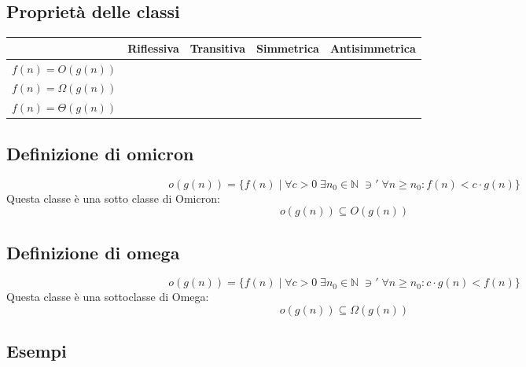 \documentclass[italian]{article}
\newcommand{\crossmark}{\textcolor{red}{\text{\ding{56}}}}
\renewcommand{\checkmark}{\textcolor{ForestGreen}{\text{\ding{52}}}}
\newcommand{\ins}[1]{\text{$\mathbb{#1}$}}
\newcommand{\taleche}{\;\ni'\;}
\newcommand{\omicron}{o}
\newcommand{\varOmegaClass}{\varOmega(g(n))}
\newcommand{\varOmicron}{O}
\newcommand{\omicronClass}{\omicron(g(n))}
\newcommand{\varOmicronClass}{\varOmicron(g(n))}
\newcommand{\varThetaClass}{\varTheta(g(n))}
\newcommand{\fn}{f(n)}
\newcommand{\gn}{g(n)}
\let\oldexists\exists
\renewcommand{\exists}{\text{$\;\oldexists$}}
\begin{document}
\subsection{Proprietà delle classi}
\begin{table}[h]
	\centering
	\begin{tabular}{c|c|c|c|c|}
		\cline{2-5}
													  & \textbf{Riflessiva} & \textbf{Transitiva} & \textbf{Simmetrica} & \textbf{Antisimmetrica} \\ \hline
		\multicolumn{1}{|c|}{$\fn = \varOmicronClass$} & \checkmark          & \checkmark          & \crossmark          &                         \\ \hline
		\multicolumn{1}{|c|}{$\fn = \varOmegaClass$}  & \checkmark          & \checkmark          & \crossmark          &                         \\ \hline
		\multicolumn{1}{|c|}{$\fn = \varThetaClass$}  & \checkmark          & \checkmark          & \checkmark          &                         \\ \hline
	\end{tabular}
\end{table}
\subsection{Definizione di omicron}
\[
	\omicronClass = \{ \fn \;|\; \forall c > 0 \exists n_0 \in \ins{N} \taleche \forall n \geq n_0 : \fn < c\cdot \gn \}
\]
Questa classe è una sotto classe di Omicron:
\[
	\omicronClass \subseteq \varOmicronClass
\]
\subsection{Definizione di omega}
\[
	\omicronClass = \{ \fn \;|\; \forall c > 0 \exists n_0 \in \ins{N} \taleche \forall n \geq n_0 : c\cdot \gn < \fn \}
\]
Questa classe è una sottoclasse di Omega:
\[
	\omicronClass \subseteq \varOmegaClass
\]

\subsection{Esempi}
\end{document}
